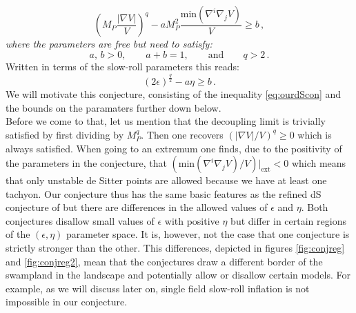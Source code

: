 \documentclass[a4paper,12pt]{report}
\newcommand{\be}{\begin{equation}}
\newcommand{\ee}{\end{equation}}
\begin{document}
\be 
\left(M_P \frac{|\nabla V|}{V}\right)^ q - a M_P^2 \frac{\text{min}(\nabla^i \nabla_j V)}{V} \geq b\,,
\label{eq:ourdScon}
\ee
\emph{where the parameters are free but need to satisfy:}
\be 
a,\, b > 0,\qquad a+b = 1, \qquad \text{and}\qquad q>2\,.
\ee
Written in terms of the slow-roll parameters this reads:
\be 
(2\epsilon)^ {\frac{q}{2}} - a \eta \geq b\,.
\label{eq:ourdSconslowroll}
\ee
We will motivate this conjecture, consisting of the inequality \eqref{eq:ourdScon} and the bounds on the paramaters further down below.\\
Before we come to that, let us mention that the decoupling limit is trivially satisfied by first dividing by $M_P^q$. Then one recovers $(|\nabla V|/V)^q \geq 0$ which is always satisfied. When going to an extremum one finds, due to the positivity of the parameters in the conjecture, that $(\text{min}(\nabla^i \nabla_j V)/V)|_{\text{ext}}<0$ which means that only unstable de Sitter points are allowed because we have at least one tachyon. Our conjecture thus has the same basic features as the refined dS conjecture of \cite{Ooguri:2018wrx} but there are differences in the allowed values of $\epsilon$ and $\eta$. Both conjectures disallow small values of $\epsilon$ with positive $\eta$ but differ in certain regions of the $(\epsilon,\eta)$ parameter space. It is, however, not the case that one conjecture is strictly stronger than the other. This differences, depicted in figures \ref{fig:conjreg} and \ref{fig:conjreg2}, mean that the conjectures draw a different border of the swampland in the landscape and potentially allow or disallow certain models. For example, as we will discuss later on, single field slow-roll inflation is not impossible in our conjecture.
\end{document}
